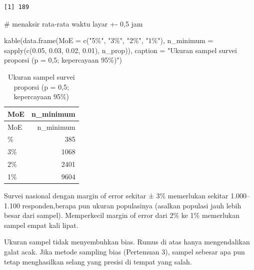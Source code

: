 \documentclass[
  indonesian,
  letterpaper,
]{book}
\newenvironment{Shaded}{\begin{snugshade}}{\end{snugshade}}
\newcommand{\AttributeTok}[1]{\textcolor[rgb]{0.40,0.45,0.13}{#1}}
\newcommand{\CommentTok}[1]{\textcolor[rgb]{0.37,0.37,0.37}{#1}}
\newcommand{\FloatTok}[1]{\textcolor[rgb]{0.68,0.00,0.00}{#1}}
\newcommand{\FunctionTok}[1]{\textcolor[rgb]{0.28,0.35,0.67}{#1}}
\newcommand{\NormalTok}[1]{\textcolor[rgb]{0.00,0.23,0.31}{#1}}
\newcommand{\StringTok}[1]{\textcolor[rgb]{0.13,0.47,0.30}{#1}}
\begin{document}
\begin{verbatim}
[1] 189
\end{verbatim}

\begin{Shaded}
\begin{Highlighting}[]
\CommentTok{\# menaksir rata{-}rata waktu layar +{-} 0,5 jam}
\end{Highlighting}
\end{Shaded}

\begin{Shaded}
\begin{Highlighting}[]
\FunctionTok{kable}\NormalTok{(}\FunctionTok{data.frame}\NormalTok{(}\AttributeTok{MoE =} \FunctionTok{c}\NormalTok{(}\StringTok{"5\%"}\NormalTok{, }\StringTok{"3\%"}\NormalTok{, }\StringTok{"2\%"}\NormalTok{, }\StringTok{"1\%"}\NormalTok{),}
\AttributeTok{n\_minimum =} \FunctionTok{sapply}\NormalTok{(}\FunctionTok{c}\NormalTok{(}\FloatTok{0.05}\NormalTok{, }\FloatTok{0.03}\NormalTok{, }\FloatTok{0.02}\NormalTok{, }\FloatTok{0.01}\NormalTok{), n\_prop)),}
\AttributeTok{caption =} \StringTok{"Ukuran sampel survei proporsi (p = 0,5; kepercayaan 95\%)"}\NormalTok{)}
\end{Highlighting}
\end{Shaded}

\begin{longtable}[]{@{}lr@{}}
\caption{Ukuran sampel survei proporsi (p = 0,5; kepercayaan
95\%)}\tabularnewline
\toprule\noalign{}
MoE & n\_minimum \\
\midrule\noalign{}
\endfirsthead
\toprule\noalign{}
MoE & n\_minimum \\
\midrule\noalign{}
\endhead
\bottomrule\noalign{}
\endlastfoot
5\% & 385 \\
3\% & 1068 \\
2\% & 2401 \\
1\% & 9604 \\
\end{longtable}

Survei nasional dengan margin of error sekitar ± 3\% memerlukan sekitar
1.000--1.100 responden,berapa pun ukuran populasinya (asalkan populasi
jauh lebih besar dari sampel). Memperkecil margin of error dari 2\% ke
1\% memerlukan sampel empat kali lipat.

Ukuran sampel tidak menyembuhkan bias. Rumus di atas hanya mengendalikan
galat acak. Jika metode sampling bias (Pertemuan 3), sampel sebesar apa
pun tetap menghasilkan selang yang presisi di tempat yang salah.
\end{document}
